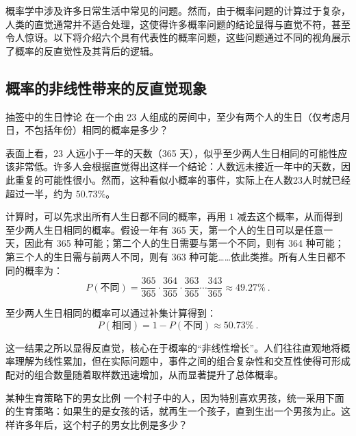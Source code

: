 
概率学中涉及许多日常生活中常见的问题。然而，由于概率问题的计算过于复杂，人类的直觉通常并不适合处理，这使得许多概率问题的结论显得与直觉不符，甚至令人惊讶。以下将介绍六个具有代表性的概率问题，这些问题通过不同的视角展示了概率的反直觉性及其背后的逻辑。

\subsection{概率的非线性带来的反直觉现象}

\begin{example}{抽签中的生日悖论}
在一个由 23 人组成的房间中，至少有两个人的生日（仅考虑月日，不包括年份）相同的概率是多少？
\end{example}

表面上看，23 人远小于一年的天数（365 天），似乎至少两人生日相同的可能性应该非常低。许多人会根据直觉得出这样一个结论：人数远未接近一年中的天数，因此重复的可能性很小。然而，这种看似小概率的事件，实际上在人数23人时就已经超过一半，约为 $50.73\%$。

计算时，可以先求出所有人生日都不同的概率，再用 $1$ 减去这个概率，从而得到至少两人生日相同的概率。假设一年有 365 天，第一个人的生日可以是任意一天，因此有 365 种可能；第二个人的生日需要与第一个不同，则有 364 种可能；第三个人的生日需与前两人不同，则有 363 种可能……依此类推。所有人生日都不同的概率为：
\begin{equation}
P(\text{不同}) = \frac{365}{365} \cdot \frac{364}{365} \cdot \frac{363}{365} \cdots \frac{343}{365}\approx49.27\%~.
\end{equation}

至少两人生日相同的概率可以通过补集计算得到：
\begin{equation}
P(\text{相同})= 1 - P(\text{不同})\approx50.73\%~.
\end{equation}

这一结果之所以显得反直觉，核心在于概率的“非线性增长”。人们往往直观地将概率理解为线性累加，但在实际问题中，事件之间的组合复杂性和交互性使得可形成配对的组合数量随着取样数迅速增加，从而显著提升了总体概率。

\begin{example}{某种生育策略下的男女比例}
一个村子中的人，因为特别喜欢男孩，统一采用下面的生育策略：如果生的是女孩的话，就再生一个孩子，直到生出一个男孩为止。这样许多年后，这个村子的男女比例是多少？
\end{example}

